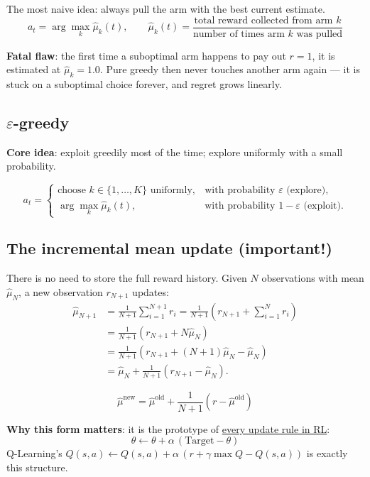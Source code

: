 \documentclass{article}
\begin{document}
The most naive idea: always pull the arm with the best current estimate.
\[
a_t = \arg\max_k \hat{\mu}_k(t), \qquad
\hat{\mu}_k(t) = \frac{\text{total reward collected from arm } k}{\text{number of times arm } k \text{ was pulled}}
\]

\textbf{Fatal flaw}: the first time a suboptimal arm happens to pay out $r=1$, it is estimated at $\hat{\mu}_k = 1.0$. Pure greedy then never touches another arm again --- it is stuck on a suboptimal choice forever, and regret grows linearly.

\subsection*{$\varepsilon$-greedy}

\textbf{Core idea}: exploit greedily most of the time; explore uniformly with a small probability.

\[
a_t = \begin{cases}
  \text{choose } k \in \{1,\ldots,K\} \text{ uniformly}, & \text{with probability } \varepsilon \text{ (explore)},\\[4pt]
  \arg\max_k \hat{\mu}_k(t), & \text{with probability } 1-\varepsilon \text{ (exploit)}.
\end{cases}
\]

\subsection*{The incremental mean update (important!)}

There is no need to store the full reward history. Given $N$ observations with mean $\hat{\mu}_N$, a new observation $r_{N+1}$ updates:
\[
\begin{aligned}
\hat{\mu}_{N+1} &= \frac{1}{N+1}\sum_{i=1}^{N+1} r_i
                 = \frac{1}{N+1}\left(r_{N+1} + \sum_{i=1}^{N} r_i\right) \\[4pt]
                &= \frac{1}{N+1}\left(r_{N+1} + N\hat{\mu}_N\right) \\[4pt]
                &= \frac{1}{N+1}\left(r_{N+1} + (N+1)\hat{\mu}_N - \hat{\mu}_N\right) \\[4pt]
                &= \hat{\mu}_N + \frac{1}{N+1}\left(r_{N+1} - \hat{\mu}_N\right).
\end{aligned}
\]

\[
\boxed{\hat{\mu}^{\text{new}} = \hat{\mu}^{\text{old}} + \frac{1}{N+1}\left(r - \hat{\mu}^{\text{old}}\right)}
\]

\textbf{Why this form matters}: it is the prototype of \underline{every update rule in RL}:
\[
\theta \leftarrow \theta + \alpha\,(\text{Target} - \theta)
\]
Q-Learning's $Q(s,a) \leftarrow Q(s,a) + \alpha\,(r + \gamma\max Q - Q(s,a))$ is exactly this structure.
\end{document}
